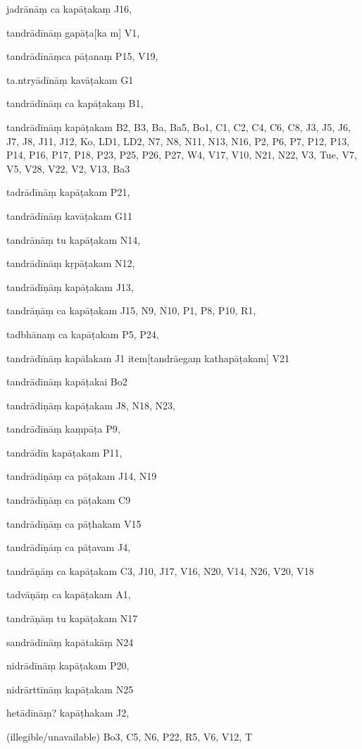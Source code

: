 \begin{ekdosis}
\begin{marma}[hp01_055]
\begin{marma}[hp02_009]
\begin{marma}[hp02_011]
 \begin{marma}[hp02_33b]
\item[jadrānāṃ ca kapāṭakaṃ] J16,
\item[tandrādīnāṃ gapāṭa[ka]m] V1,
\item[tandrādīnāṃca pāṭanaṃ] P15, V19,
\item[ta.ntryādīnāṃ kavāṭakam] G1
\item[tandrādīnāṃ ca kapāṭakaṃ] B1,
\item[tandrādīnāṃ kapāṭakam] B2, B3, Ba, Ba5, Bo1, C1, C2, C4, C6, C8, J3, J5, J6, J7, J8, J11, J12, Ko, LD1, LD2, N7, N8, N11, N13, N16, P2, P6, P7, P12, P13, P14, P16, P17, P18, P23, P25, P26, P27, W4, V17, V10, N21, N22, V3, Tue, V7, V5, V28, V22, V2, V13, Ba3
\item[tadrādīnāṃ kapāṭakam] P21,
\item[tandrādīnāṃ kavāṭakam] G11
\item[tandrānāṃ tu kapāṭakam] N14,
\item[tandrādīnāṃ kṛpāṭakam] N12, 
\item[tandrādīṇāṃ kapāṭakam] J13, 
\item[tandrāṇāṃ ca kapāṭakam] J15, N9, N10, P1, P8, P10, R1, 
\item[tadbhānaṃ ca kapāṭakam] P5, P24, 
\item[tandrādīnāṃ kapālakam] J1
item[tandrāegaṃ kathapāṭakam] V21
\item[tandrādīnāṃ kapāṭakai] Bo2
\item[tandrādiṇāṃ kapāṭakam] J8, N18, N23,
\item[tandrādīnāṃ kaṃpāṭa] P9, 
\item[tandrādīn kapāṭakam] P11,
\item[tandrādiṇāṃ ca pāṭakam] J14, N19
\item[tandrādīṇāṃ ca pāṭakam] C9
\item[tandrādīṇāṃ ca pāṭhakam] V15
\item[tandrādīṇāṃ ca pāṭavam] J4,
\item[tandrāṇāṃ ca kapāṭakam] C3, J10, J17, V16, N20, V14, N26, V20, V18
\item[tadvāṇāṃ ca kapāṭakam] A1,
\item[tandrāṇāṃ tu kapāṭakam] N17
\item[sandrādīnāṃ kapātakāṃ] N24
\item[nidrādīnāṃ kapāṭakam] P20,
\item[nidrārttīnāṃ kapāṭakam] N25
\item[hetādīnāṃ? kapāṭhakam] J2,
\item[(illegible/unavailable)] Bo3, C5, N6, P22, R5, V6, V12, T
  \begin{description}


\end{description}
\end{marma}
\end{marma}
\end{marma}
\end{marma}
\end{ekdosis}
